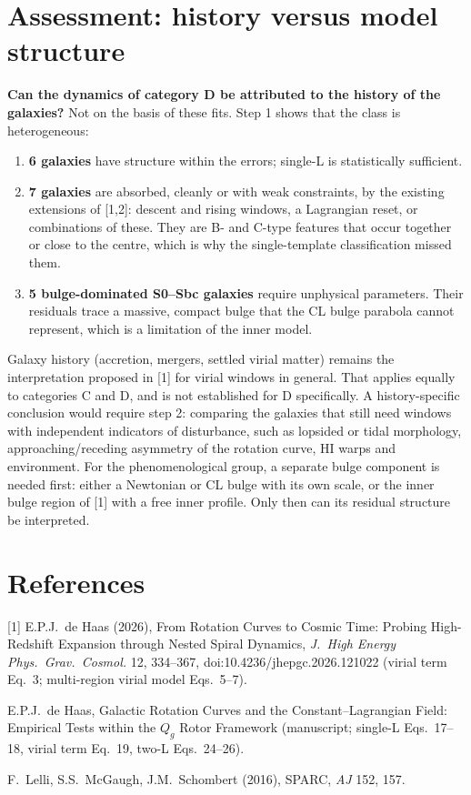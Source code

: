 \documentclass[10pt]{article}
\begin{document}
\section{Assessment: history versus model structure}
\textbf{Can the dynamics of category D be attributed to the history of the galaxies?} Not on the basis of these fits. Step 1 shows that the class is heterogeneous:
\begin{enumerate}\itemsep1pt
\item \textbf{6 galaxies} have structure within the errors; single-L is statistically sufficient.
\item \textbf{7 galaxies} are absorbed, cleanly or with weak constraints, by the existing extensions of [1,2]: descent and rising windows, a Lagrangian reset, or combinations of these. They are B- and C-type features that occur together or close to the centre, which is why the single-template classification missed them.
\item \textbf{5 bulge-dominated S0--Sbc galaxies} require unphysical parameters. Their residuals trace a massive, compact bulge that the CL bulge parabola cannot represent, which is a limitation of the inner model.
\end{enumerate}
Galaxy history (accretion, mergers, settled virial matter) remains the interpretation proposed in [1] for virial windows in general. That applies equally to categories C and D, and is not established for D specifically. A history-specific conclusion would require step 2: comparing the galaxies that still need windows with independent indicators of disturbance, such as lopsided or tidal morphology, approaching/receding asymmetry of the rotation curve, HI warps and environment. For the phenomenological group, a separate bulge component is needed first: either a Newtonian or CL bulge with its own scale, or the inner bulge region of [1] with a free inner profile. Only then can its residual structure be interpreted.

\section*{References}\small
[1] E.P.J.\ de Haas (2026), From Rotation Curves to Cosmic Time: Probing High-Redshift Expansion through Nested Spiral Dynamics, \emph{J.\ High Energy Phys.\ Grav.\ Cosmol.} 12, 334--367, doi:10.4236/jhepgc.2026.121022 (virial term Eq.~3; multi-region virial model Eqs.~5--7).\par
[2] E.P.J.\ de Haas, Galactic Rotation Curves and the Constant--Lagrangian Field: Empirical Tests within the $Q_g$ Rotor Framework (manuscript; single-L Eqs.~17--18, virial term Eq.~19, two-L Eqs.~24--26).\par
[3] F.\ Lelli, S.S.\ McGaugh, J.M.\ Schombert (2016), SPARC, \emph{AJ} 152, 157.
\end{document}
